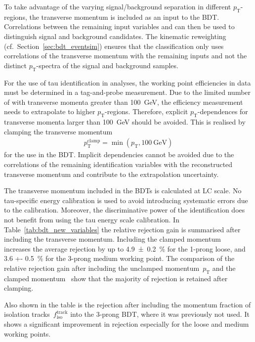 To take advantage of the varying signal/background separation in different
$p_\text{T}$-regions, the \tauhadvis transverse momentum is included as an input
to the BDT. Correlations between the remaining input variables and \pt can then
be used to distinguish signal and background candidates. The kinematic
reweighting (cf.\ Section~\ref{sec:bdt_eventsim}) ensures that the
classification only uses correlations of the transverse momentum with the
remaining inputs and not the distinct $p_\text{T}$-spectra of the signal and
background samples.

For the use of tau identification in analyses, the working point efficiencies in
data must be determined in a tag-and-probe measurement. Due to the limited
number of \tauhadvis with transverse momenta greater than \SI{100}{\GeV}, the
efficiency measurement needs to extrapolate to higher $p_\text{T}$-regions.
Therefore, explicit $p_\text{T}$-dependences for transverse momenta larger than
\SI{100}{\GeV} should be avoided. This is realised by clamping the transverse
momentum
\begin{align*}
  p_\text{T}^\text{clamp} = \min(p_\text{T}, \SI{100}{\giga\electronvolt})
\end{align*}
for the use in the BDT. Implicit dependencies cannot be avoided due to the
correlations of the remaining identification variables with the reconstructed
transverse momentum and contribute to the extrapolation uncertainty.

The transverse momentum included in the BDTs is calculated at LC scale. No
tau-specific energy calibration is used to avoid introducing systematic errors
due to the calibration. Moreover, the discriminative power of the identification
does not benefit from using the tau energy scale calibration. In
Table~\ref{tab:bdt_new_variables} the relative rejection gain is summarised
after including the transverse momentum. Including the clamped
momentum~ increases the average rejection by up
to \SI{4.9 +- 0.2}{\percent} for the 1-prong loose, and \SI{3.6 +-
  0.5}{\percent} for the 3-prong medium working point. The comparison of the
relative rejection gain after including the unclamped momentum~$p_\text{T}$ and
the clamped momentum~ show that the majority of
rejection is retained after clamping. 

Also shown in the table is the rejection after including the momentum fraction
of isolation tracks~$f_\text{iso}^\text{track}$ into the 3-prong BDT, where it
was previously not used. It shows a significant improvement in rejection
especially for the loose and medium working points.

